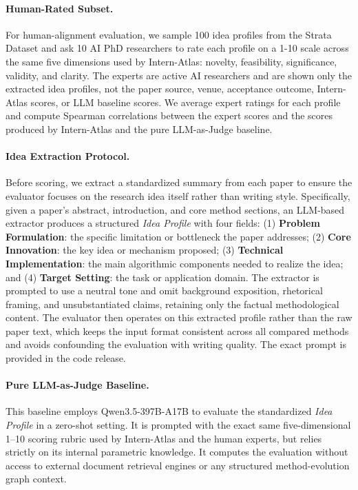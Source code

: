 \documentclass{llmxive}
\begin{document}
\paragraph{Human-Rated Subset.}
For human-alignment evaluation, we sample 100 idea profiles from the Strata Dataset and ask 10 AI PhD researchers to rate each profile on a 1-10 scale across the same five dimensions used by Intern-Atlas: novelty, feasibility, significance, validity, and clarity. The experts are active AI researchers and are shown only the extracted idea profiles, not the paper source, venue, acceptance outcome, Intern-Atlas scores, or LLM baseline scores. We average expert ratings for each profile and compute Spearman correlations between the expert scores and the scores produced by Intern-Atlas and the pure LLM-as-Judge baseline.

\paragraph{Idea Extraction Protocol.}
Before scoring, we extract a standardized summary from each paper to ensure the evaluator focuses on the research idea itself rather than writing style. Specifically, given a paper's abstract, introduction, and core method sections, an LLM-based extractor produces a structured \emph{Idea Profile} with four fields: (1) \textbf{Problem Formulation}: the specific limitation or bottleneck the paper addresses; (2) \textbf{Core Innovation}: the key idea or mechanism proposed; (3) \textbf{Technical Implementation}: the main algorithmic components needed to realize the idea; and (4) \textbf{Target Setting}: the task or application domain.
The extractor is prompted to use a neutral tone and omit background exposition, rhetorical framing, and unsubstantiated claims, retaining only the factual methodological content. The evaluator then operates on this extracted profile rather than the raw paper text, which keeps the input format consistent across all compared methods and avoids confounding the evaluation with writing quality. The exact prompt is provided in the code release.

\paragraph{Pure LLM-as-Judge Baseline.}
This baseline employs Qwen3.5-397B-A17B to evaluate the standardized \emph{Idea Profile} in a zero-shot setting. It is prompted with the exact same five-dimensional 1--10 scoring rubric used by Intern-Atlas and the human experts, but relies strictly on its internal parametric knowledge. It computes the evaluation without access to external document retrieval engines or any structured method-evolution graph context.
\end{document}
